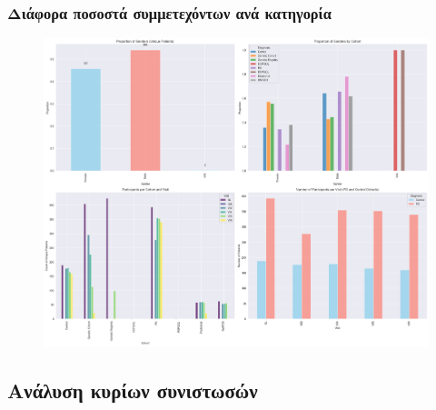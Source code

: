 \documentclass[12pt]{report}
\begin{document}
            \subsubsection*{Διάφορα ποσοστά συμμετεχόντων ανά κατηγορία}
                \vspace{-0.5cm}
                \begin{figure}[H]
                    \centering
                    \includegraphics[width=1\textwidth]{Chapter-2-Section-2.1/ppmi-prop-gender-abs-per-cohort_samples-per-coh-visit-all-coh_pd-vs-ctrl.png}
                    \label{fig:app_ppmi_prop_divers}
                \end{figure}
        \subsection*{Ανάλυση κυρίων συνιστωσών}
\end{document}
